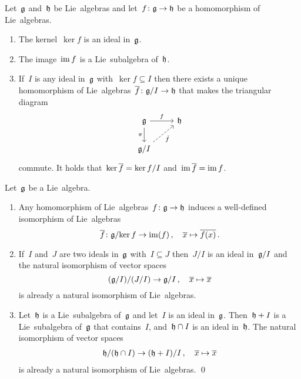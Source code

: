 \begin{proposition}
  Let~$\mathfrak{g}$ and~$\mathfrak{h}$ be Lie~algebras and let~$f \colon \mathfrak{g} \to \mathfrak{h}$ be a homomorphism of Lie~algebras.
  \begin{enumerate}
    \item
      The kernel~$\ker f$ is an ideal in~$\mathfrak{g}$.
    \item
      The image~$\operatorname{im} f$ is a Lie~subalgebra of~$\mathfrak{h}$.
    \item
      If~$I$ is any ideal in~$\mathfrak{g}$ with~$\ker f \subseteq I$ then there exists a unique homomorphism of Lie~algebras~$\overline{f} \colon \mathfrak{g}/I \to \mathfrak{h}$ that makes the triangular diagram
      \[
        \begin{tikzcd}
          \glie
          \arrow{r}[above]{f}
          \arrow{d}[left]{\pi}
          &
          \hlie
          \\
          \glie/I
          \arrow[dashed]{ur}[below right]{\tilde{f}}
          &
          {}
        \end{tikzcd}
      \]
      commute.
      It holds that~$\ker \overline{f} = {\ker f}/I$ and~$\operatorname{im} \overline{f} = \operatorname{im} f$.
  \end{enumerate}
\end{proposition}


\begin{corollary}
  Let~$\mathfrak{g}$ be a Lie~algebra.
  \begin{enumerate}
    \item
      Any homomorphism of Lie~algebras~$f \colon \mathfrak{g} \to \mathfrak{h}$ induces a well-defined isomorphism of Lie~algebras
      \[
        \overline{f}
        \colon
        \mathfrak{g}/{\ker f}
        \to
        \operatorname{im}(f)  \,,
        \quad
        \overline{x}
        \mapsto
        \overline{f(x)}  \,.
      \]
    \item
      If~$I$ and~$J$ are two ideals in~$\mathfrak{g}$ with~$I \subseteq J$ then~$J/I$ is an ideal in~$\mathfrak{g}/I$ and the natural isomorphism of vector spaces
      \[
        (\mathfrak{g}/I) / (J/I)
        \to
        \mathfrak{g}/I \,,
        \quad
        \overline{x}
        \mapsto
        \overline{x}
      \]
      is already a natural isomorphism of Lie~algebras.
    \item
      Let~$\mathfrak{h}$ is a Lie~subalgebra of~$\mathfrak{g}$ and let~$I$ is an ideal in~$\mathfrak{g}$.
      Then~$\mathfrak{h} + I$ is a Lie~subalgebra of~$\mathfrak{g}$ that contains~$I$, and~$\mathfrak{h} \cap I$ is an ideal in~$\mathfrak{h}$.
      The natural isomorphism of vector spaces
      \begin{gather*}
        \mathfrak{h}/(\mathfrak{h} \cap I)
        \to
        (\mathfrak{h} + I)/I \,,
        \quad
        \overline{x}
        \mapsto
        \overline{x}
      \end{gather*}
      is already a natural isomorphism of Lie~algebras.
    \qed
  \end{enumerate}
\end{corollary}


